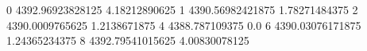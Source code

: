 0 4392.96923828125 4.18212890625
1 4390.56982421875 1.78271484375
2 4390.0009765625 1.2138671875
4 4388.787109375 0.0
6 4390.03076171875 1.24365234375
8 4392.79541015625 4.00830078125
